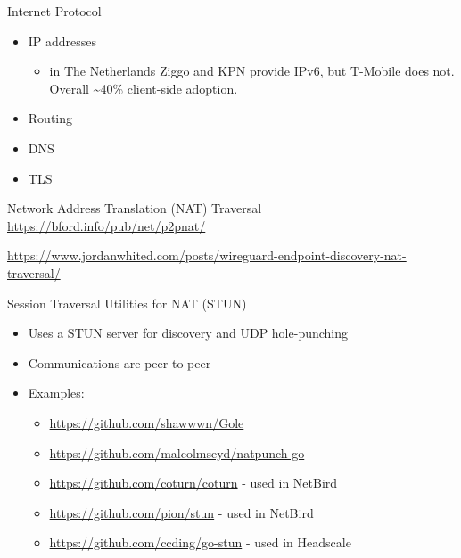 \label{notes__02021-internet-protocol.md}
\begin{block}{Internet Protocol}
\label{notes__02021-internet-protocol.md__internet-protocol}
\begin{itemize}
\item
  IP addresses

  \begin{itemize}
  \tightlist
  \item
    in The Netherlands Ziggo and KPN provide IPv6, but T-Mobile does not. Overall \textasciitilde40\% client-side adoption.
  \end{itemize}
\item
  Routing
\item
  DNS
\item
  TLS
\end{itemize}

\begin{block}{Network Address Translation (NAT) Traversal}
\label{notes__02021-internet-protocol.md__network-address-translation-nat-traversal}
\url{https://bford.info/pub/net/p2pnat/}

\url{https://www.jordanwhited.com/posts/wireguard-endpoint-discovery-nat-traversal/}
\end{block}

\begin{block}{Session Traversal Utilities for NAT (STUN)}
\label{notes__02021-internet-protocol.md__session-traversal-utilities-for-nat-stun}
\begin{itemize}
\item
  Uses a STUN server for discovery and UDP hole-punching
\item
  Communications are peer-to-peer
\item
  Examples:

  \begin{itemize}
  \item
    \url{https://github.com/shawwwn/Gole}
  \item
    \url{https://github.com/malcolmseyd/natpunch-go}
  \item
    \url{https://github.com/coturn/coturn} - used in NetBird
  \item
    \url{https://github.com/pion/stun} - used in NetBird
  \item
    \url{https://github.com/ccding/go-stun} - used in Headscale
  \end{itemize}
\end{itemize}
\end{block}


\end{block}

